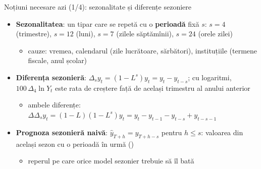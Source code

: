 \begin{frame}{Noțiuni necesare azi (1/4): sezonalitate și diferențe sezoniere}
\itemsize{\small}
\begin{itemize}
    \item \textbf{Sezonalitatea}: un tipar care se repetă cu o \textbf{perioadă} fixă $s$: $s = 4$ (trimestre), $s = 12$ (luni), $s = 7$ (zilele săptămînii), $s = 24$ (orele zilei)
    \begin{itemize}
        \item cauze: vremea, calendarul (zile lucrătoare, sărbători), instituțiile (termene fiscale, anul școlar)
    \end{itemize}
    \item \textbf{Diferența sezonieră}: $\Delta_s y_t = (1 - L^s)y_t = y_t - y_{t-s}$; cu logaritmi, $100\,\Delta_4\ln Y_t$ este rata de creștere față de același trimestru al anului anterior
    \begin{itemize}
        \item ambele diferențe: $\Delta\Delta_s y_t = (1 - L)(1 - L^s)y_t = y_t - y_{t-1} - y_{t-s} + y_{t-s-1}$
    \end{itemize}
    \item \textbf{Prognoza sezonieră naivă}: $\hat y_{T+h} = y_{T+h-s}$ pentru $h \le s$: valoarea din același sezon cu o perioadă în urmă ()
    \begin{itemize}
        \item reperul pe care orice model sezonier trebuie să îl bată
    \end{itemize}
\end{itemize}
\end{frame}

